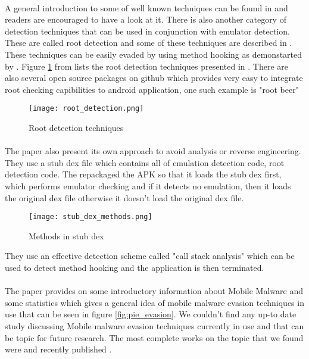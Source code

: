 \documentclass[../main.tex]{subfile}
\begin{document}
	\paragraph{} A general introduction to some of well known techniques can be found in \cite{geist2016jailbreak} and readers are encouraged to have a look at it. There is also another category of detection techniques that can be used in conjunction with emulator detection. These are called root detection and some of these techniques are described in \cite{sun2015android}. These techniques can be easily evaded by using method hooking as demonstarted by \cite{lim2016android}. Figure \ref{fig:root_detection} from \cite{lim2016android} lists the root detection techniques presented in \cite{sun2015android}. There are also several open source packages on github which provides very easy to integrate root checking capibilities to android application, one such example is "root beer" \cite{rootbeer}
	
	\begin{figure}
		\texttt{[image: root\_detection.png]}
		\caption{Root detection techniques \cite{lim2016android} \cite{sun2015android}}
		\label{fig:root_detection}			
	\end{figure}

	\paragraph{} The paper \cite{lim2016android} also present its own approach to avoid analysis or reverse engineering. They use a stub dex file which contains all of emulation detection code, root detection code. The repackaged the APK so that it loads the stub dex first, which performs emulator checking and if it detects no emulation, then it loads the original dex file otherwise it doesn't load the original dex file.
	\begin{figure}
		\texttt{[image: stub\_dex\_methods.png]}
		\caption{Methods in stub dex \cite{lim2016android}}
		\label{fig:stub_dex_methods}			
	\end{figure}
	They use an effective detection scheme called "call stack analysis" which can be used to detect method hooking and the application is then terminated.


	\paragraph{} The paper \cite{amro2018malware} provides on some introductory information about Mobile Malware and some statistics which gives a general idea of mobile malware evasion techniques in use that can be seen in figure \ref{fig:pie_evasion}. We couldn't find any up-to date study discussing Mobile malware evasion techniques currently in use and that can be topic for future research.  The most complete works on the topic that we found were \cite{vidas2014evading} and recently published \cite{ares}.
	
\end{document}
